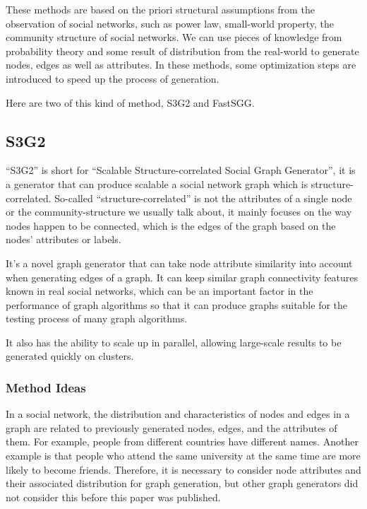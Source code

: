 \begin{survey}
These methods are based on the priori structural assumptions from the
observation of social networks, such as power law, small-world property,
the community structure of social networks. We can use pieces of
knowledge from probability theory and some result of distribution from
the real-world to generate nodes, edges as well as attributes. In these
methods, some optimization steps are introduced to speed up the process
of generation.

Here are two of this kind of method, S3G2 and FastSGG.

\subsection{S3G2\cite{Minh2012S3G2}}

“S3G2” is short for “Scalable Structure-correlated Social Graph
Generator”, it is a generator that can produce scalable a social network
graph which is structure-correlated. So-called “structure-correlated” is
not the attributes of a single node or the community-structure we
usually talk about, it mainly focuses on the way nodes happen to be
connected, which is the edges of the graph based on the nodes'
attributes or labels.

It's a novel graph generator that can take node attribute similarity
into account when generating edges of a graph. It can keep similar graph
connectivity features known in real social networks, which can be an
important factor in the performance of graph algorithms so that it can
produce graphs suitable for the testing process of many graph
algorithms.

It also has the ability to scale up in parallel, allowing large-scale
results to be generated quickly on clusters.

\subsubsection{Method Ideas}

In a social network, the distribution and characteristics of nodes and
edges in a graph are related to previously generated nodes, edges, and
the attributes of them. For example, people from different countries
have different names. Another example is that people who attend the same
university at the same time are more likely to become friends.
Therefore, it is necessary to consider node attributes and their
associated distribution for graph generation, but other graph generators
did not consider this before this paper was published.


\end{survey}
